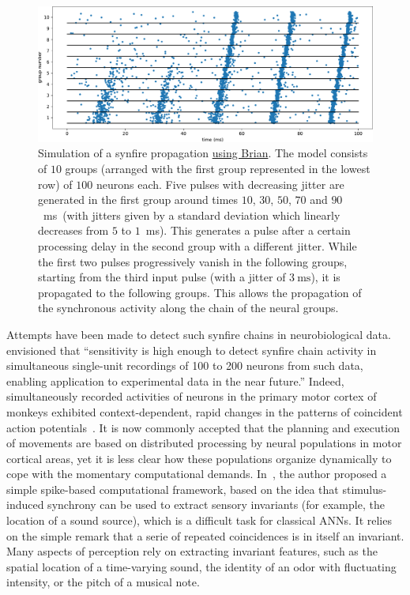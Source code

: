 \documentclass[brainsci, %
               review,accept,pdftex,moreauthors
               ]{Definitions/mdpi}
\newcommand{\ms}{\si{\milli\second}}%
\begin{document}
\begin{figure}[H]
\includegraphics[width=\textwidth]{figures/Diesmann_et_al_1999.pdf}
\caption{
  Simulation of a synfire propagation \href{https://brian2.readthedocs.io/en/stable/examples/frompapers.Diesmann_et_al_1999.html}{using Brian}.
  The model consists of $10$ groups (arranged with the first group represented in the lowest row) of $100$ neurons each. Five pulses with decreasing jitter are generated in the first group around times $10$, $30$, $50$, $70$ and $90$~\ms~(with jitters given by a standard deviation which linearly decreases from $5$ to $1$~\ms). This generates a pulse after a certain processing delay in the second group with a different jitter. While the first two pulses progressively vanish in the following groups, starting from the third input pulse (with a jitter of $3~\ms$), it is propagated to the following groups. This allows the propagation of the synchronous activity along the chain of the neural groups.}\label{fig:diesman}
\end{figure}

Attempts have been made to detect such synfire chains in neurobiological data. \citet{schrader_detecting_2008} envisioned that ``sensitivity is high enough to detect synfire chain activity in simultaneous single-unit recordings of 100 to 200 neurons from such data, enabling application to experimental data in the near future.'' Indeed, simultaneously recorded activities of neurons in the primary motor cortex of monkeys exhibited context-dependent, rapid changes in the patterns of coincident action potentials~\citep{riehle_spike_1997,grammont_precise_1999}. It is now commonly accepted that the planning and execution of movements are based on distributed processing by neural populations in motor cortical areas, yet it is less clear  how these populations organize dynamically to cope with the momentary computational demands.  In~\citep{brette_computing_2012}, the author proposed a simple spike-based computational framework, based on the idea that stimulus-induced synchrony can be used to extract sensory invariants (for example, the location of a sound source), which is a difficult task for classical ANNs. It relies on the simple remark that a serie of repeated coincidences is in itself an invariant. Many aspects of perception rely on extracting invariant features, such as the spatial location of a time-varying sound, the identity of an odor with fluctuating intensity, or the pitch of a musical note.
\end{document}
